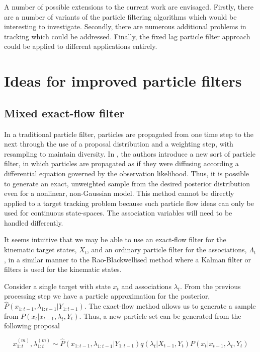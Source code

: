 A number of possible extensions to the current work are envisaged. Firstly, there are a number of variants of the particle filtering algorithms which would be interesting to investigate. Secondly, there are numerous additional problems in tracking which could be addressed. Finally, the fixed lag particle filter approach could be applied to different applications entirely.



\section{Ideas for improved particle filters}

\subsection{Mixed exact-flow filter}
In a traditional particle filter, particles are propagated from one time step to the next through the use of a proposal distribution and a weighting step, with resampling to maintain diversity. In \cite{Daum2010}, the authors introduce a new sort of particle filter, in which particles are propagated as if they were diffusing according a differential equation governed by the observation likelihood. Thus, it is possible to generate an exact, unweighted sample from the desired posterior distribution even for a nonlinear, non-Gaussian model. This method cannot be directly applied to a target tracking problem because such particle flow ideas can only be used for continuous state-spaces. The association variables will need to be handled differently.

It seems intuitive that we may be able to use an exact-flow filter for the kinematic target states, $X_t$, and an ordinary particle filter for the associations, $\Lambda_t$, in a similar manner to the Rao-Blackwellised method where a Kalman filter or filters is used for the kinematic states.

Consider a single target with state $x_t$ and associations $\lambda_t$. From the previous processing step we have a particle approximation for the posterior, $\hat{P}(x_{1:t-1}, \lambda_{1:t-1}|Y_{1:t-1})$. The exact-flow method allows us to generate a sample from $P(x_t|x_{t-1}, \lambda_t, Y_t)$. Thus, a new particle set can be generated from the following proposal

\begin{equation}
x_{1:t}^{(m)},\lambda_{1:t}^{(m)} \sim \hat{P}(x_{1:t-1}, \lambda_{1:t-1}|Y_{1:t-1}) q(\lambda_t|X_{t-1}, Y_t) P(x_t|x_{t-1}, \lambda_t, Y_t)
\end{equation}

